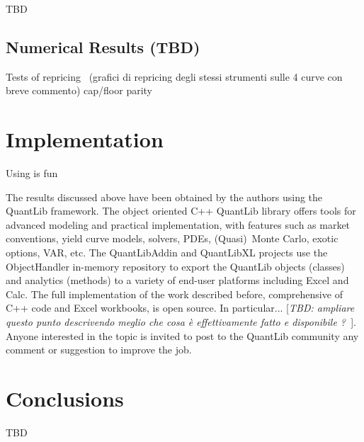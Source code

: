 \documentclass[11pt,reqno]{amsart}
\begin{document}
TBD

\subsection{Numerical Results (TBD)}

Tests of repricing \ (grafici di repricing degli stessi strumenti sulle 4
curve con breve commento)\newline
cap/floor parity

\section{Implementation}

Using \cite{ql090} is fun

The results discussed above have been obtained by the authors using the
QuantLib framework. The object oriented C++ QuantLib library \cite{QuantLib}
offers tools for advanced modeling and practical implementation, with
features such as market conventions, yield curve models, solvers, PDEs,
(Quasi)\ Monte Carlo, exotic options, VAR, etc. The QuantLibAddin \cite%
{QuantLibAddin} and QuantLibXL \cite{QuantLibXL} projects use the
ObjectHandler in-memory repository \cite{ObjectHandler} to export the
QuantLib objects (classes) and analytics (methods) to a variety of end-user
platforms including Excel and Calc. The full implementation of the work
described before, comprehensive of C++ code and Excel workbooks, is open
source. In particular... 
[\textit{TBD: ampliare questo punto descrivendo
meglio che cosa \`{e} effettivamente fatto e disponibile ?\ }]. Anyone
interested in the topic is invited to post to the QuantLib community any
comment or suggestion to improve the job.

\section{\textbf{Conclusions}}

TBD




\end{document}
